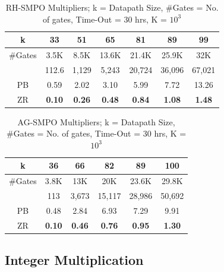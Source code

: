 \begin{Example}
\end{Example}

\begin{table}[H]
\centering
\caption{RH-SMPO Multipliers; k = Datapath Size, \#Gates = No. of gates, Time-Out = 30 hrs, K = $10^3$}
\label{rhsmpo}
\begin{tabular}{| c | c | c | c | c | c | c |} \hline
k&33&51&65&81&89&99 \\ \hline
\#Gates & 3.5K&8.5K & 13.6K&21.4K & 25.9K& 32K\\ \hline
\cite{xiaojun:date15} & 112.6& 1,129&5,243 &20,724 &36,096 &67,021 \\ \hline
PB & 0.59& 2.02&3.10 &5.99 &7.72 &13.26 \\ \hline
ZR &\textbf{0.10} & \textbf{0.26}& \textbf{0.48}& \textbf{0.84}&\textbf{1.08} & \textbf{1.48}\\ \hline
\end{tabular}
\end{table}

\begin{table}[H]
\centering
\caption{AG-SMPO Multipliers; k = Datapath Size, \#Gates = No. of gates, Time-Out = 30 hrs, K = $10^3$}
\label{agsmpo}
\begin{tabular}{| c | c | c | c | c | c |} \hline
k&36&66&82&89&100 \\ \hline
\#Gates &3.8K&13K&20K & 23.6K&29.8K \\ \hline
\cite{xiaojun:date15} & 113& 3,673& 15,117& 28,986& 50,692\\ \hline
PB &0.48 & 2.84& 6.93&7.29 & 9.91 \\ \hline
ZR & \textbf{0.10}&\textbf{0.46} &\textbf{0.76} &\textbf{0.95} &\textbf{1.30} \\ \hline
\end{tabular}
\end{table}


\subsection{Integer Multiplication}


